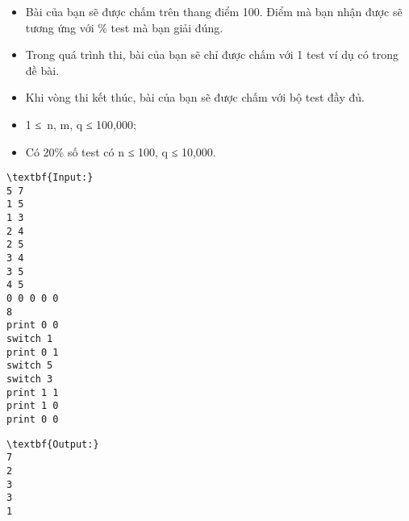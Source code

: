 \begin{itemize}
	\item Bài của bạn sẽ được chấm trên thang điểm 100. Điểm mà bạn nhận được sẽ tương ứng với \% test mà bạn giải đúng.
	\item Trong quá trình thi, bài của bạn sẽ chỉ được chấm với 1 test ví dụ có trong đề bài.
	\item Khi vòng thi kết thúc, bài của bạn sẽ được chấm với bộ test đầy đủ.
\end{itemize}
\begin{itemize}
	\item 1 ≤ n, m, q ≤ 100,000;
	\item Có 20\% số test có n ≤ 100, q ≤ 10,000.
\end{itemize}
\begin{verbatim}
\textbf{Input:}
5 7
1 5
1 3
2 4
2 5
3 4
3 5
4 5
0 0 0 0 0
8
print 0 0
switch 1
print 0 1
switch 5
switch 3
print 1 1
print 1 0
print 0 0
\end{verbatim}
\begin{verbatim}
\textbf{Output:}
7
2
3
3
1

\end{verbatim}